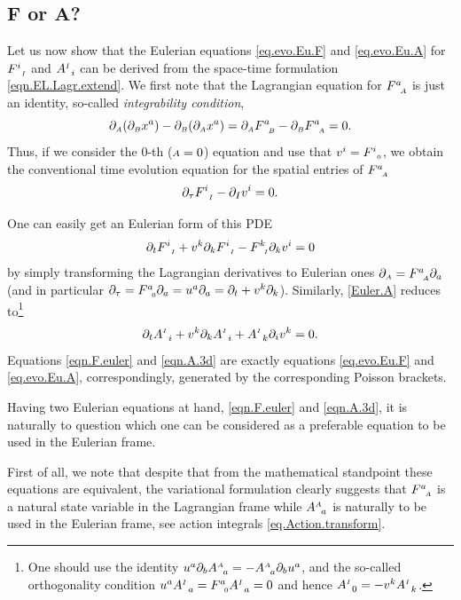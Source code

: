 \documentclass[
10pt, %
a4paper, %
oneside, %
headinclude,footinclude, %
BCOR5mm, %
]{scrartcl}
\newcommand{\FF}{\mathbf{F}}
\renewcommand{\AA}{\mathbf{A}}
\newcommand{\sA}{{\mathsmaller A}}
\newcommand{\sB}{{\mathsmaller B}}
\newcommand{\pd}{\partial}
\newcommand{\F}[2]{F^{#1}_{\ \, \mathsmaller#2}}
\newcommand{\A}[2]{A^{\mathsmaller#1}_{\ \, #2}}
\begin{document}
\subsection{$ \FF $ or $ \AA $?}




Let us now show that the Eulerian equations \eqref{eq.evo.Eu.F} and \eqref{eq.evo.Eu.A} for $ 
\F{i}{I} $ and $ \A{I}{i} $ can be derived from the space-time formulation 
\eqref{eqn.EL.Lagr.extend}. We first note that the Lagrangian equation for $ \F{a}{A} $ is just 
an identity, so-called \textit{integrability condition},
\begin{equation}\label{eqn.F.4d}
\pd_\sA (\pd_\sB x^a) - \pd_\sB (\pd_\sA x^a) = \pd_\sA \F{a}{B} - \pd_\sB \F{a}{A} = 0.
\end{equation}
Thus, if we consider the $ 0 $-th ($ \sA=0 $) equation 
and 
use that $ v^i = \F{i}{0} $, we obtain the conventional time evolution equation for the spatial 
entries of $ \F{a}{\sA} $
\begin{equation}\label{eqn.F.3d}
\pd_\tau \F{i}{I} - \pd_I v^i = 0.
\end{equation}

One can easily get an Eulerian form of this PDE
\begin{equation}\label{eqn.F.euler}
\pd_t \F{i}{I} + v^k\pd_k \F{i}{I} - \F{k}{I}\pd_k v^i = 0
\end{equation}
by simply transforming the Lagrangian derivatives to Eulerian ones $ \pd_\sA = \F{a}{\sA}\pd_a $ 
(and in particular $ \pd_\tau = \F{a}{0}\pd_a = u^a \pd_a = \pd_t + v^k\pd_k $).
Similarly, \eqref{Euler.A} reduces to\footnote{One should use the identity $ u^a\pd_b\A{A}{a} = 
-\A{A}{a}\pd_b u^a$, and the so-called orthogonality condition $ u^a\A{I}{a} = \F{a}{0}\A{I}{a} = 0 
$ and hence $ \A{I}{0} = -v^k \A{I}{k} $.}
\begin{equation}\label{eqn.A.3d}
\pd_t \A{I}{i} + v^k \pd_k \A{I}{i} + \A{I}{k}\pd_i v^k = 0.
\end{equation}
Equations \eqref{eqn.F.euler} and \eqref{eqn.A.3d} are exactly equations \eqref{eq.evo.Eu.F} and 
\eqref{eq.evo.Eu.A}, correspondingly, generated by the corresponding Poisson brackets.

Having two Eulerian equations at hand, \eqref{eqn.F.euler} and \eqref{eqn.A.3d}, it is naturally to 
question which one can be considered as a preferable equation to be used in the Eulerian frame.

First of all, we note that despite that from the mathematical standpoint these equations are 
equivalent, the variational formulation clearly suggests that $ \F{a}{A} $ is a natural 
state variable in the Lagrangian frame while $ \A{A}{a} $ is naturally to be used in the Eulerian 
frame, see action integrals \eqref{eq.Action.transform}. 
\end{document}
